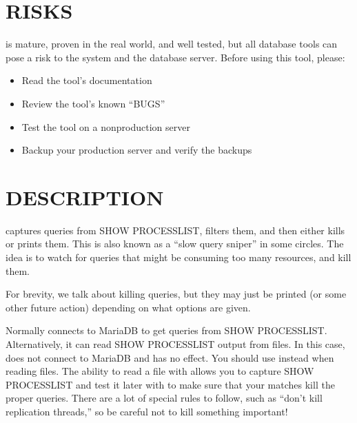 \documentclass[letterpaper,10pt,english]{sphinxmanual}
\begin{document}
\section{RISKS}
\label{\detokenize{mariadb-kill:risks}}
 is mature, proven in the real world, and well tested,
but all database tools can pose a risk to the system and the database
server.  Before using this tool, please:
\begin{itemize}
\item {} 
Read the tool’s documentation

\item {} 
Review the tool’s known “BUGS”

\item {} 
Test the tool on a non\sphinxhyphen{}production server

\item {} 
Backup your production server and verify the backups

\end{itemize}


\section{DESCRIPTION}
\label{\detokenize{mariadb-kill:description}}
 captures queries from SHOW PROCESSLIST, filters them, and then either
kills or prints them.  This is also known as a “slow query sniper” in some
circles.  The idea is to watch for queries that might be consuming too many
resources, and kill them.

For brevity, we talk about killing queries, but they may just be printed
(or some other future action) depending on what options are given.

Normally  connects to MariaDB to get queries from SHOW PROCESSLIST.
Alternatively, it can read SHOW PROCESSLIST output from files.  In this case,
 does not connect to MariaDB and {\hyperref[\detokenize{mariadb-kill:cmdoption-mariadb-kill-kill}]{}} has no effect.  You should
use {\hyperref[\detokenize{mariadb-kill:cmdoption-mariadb-kill-print}]{}} instead when reading files.  The ability to read a file
with {\hyperref[\detokenize{mariadb-kill:cmdoption-mariadb-kill-test-matching}]{}} allows you to capture SHOW PROCESSLIST and test it
later with  to make sure that your matches kill the proper queries.
There are a lot of special rules to follow, such as “don’t kill replication
threads,” so be careful not to kill something important!
\end{document}
